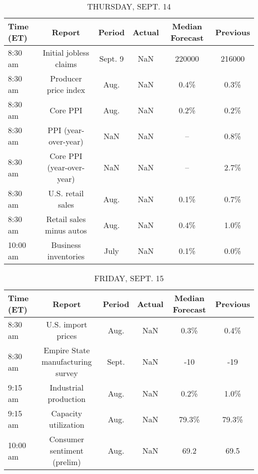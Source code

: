 \documentclass{article}%
\begin{document}
%


\begin{table}[htbp]%
\caption{THURSDAY, SEPT. 14}%
\centering%
\begin{adjustbox}{width=1\textwidth}%
\begin{tabular}{lccccc}
\toprule
Time (ET) &                    Report &  Period & Actual & Median Forecast & Previous \\
\midrule
  8:30 am &    Initial jobless claims & Sept. 9 &    NaN &          220000 &   216000 \\
  8:30 am &      Producer price index &    Aug. &    NaN &            0.4\% &     0.3\% \\
  8:30 am &                  Core PPI &    Aug. &    NaN &            0.2\% &     0.2\% \\
  8:30 am &      PPI (year-over-year) &     NaN &    NaN &              -- &     0.8\% \\
  8:30 am & Core PPI (year-over-year) &     NaN &    NaN &              -- &     2.7\% \\
  8:30 am &         U.S. retail sales &    Aug. &    NaN &            0.1\% &     0.7\% \\
  8:30 am &  Retail sales minus autos &    Aug. &    NaN &            0.4\% &     1.0\% \\
 10:00 am &      Business inventories &    July &    NaN &            0.1\% &     0.0\% \\
\bottomrule
\end{tabular}
%
\end{adjustbox}%
\end{table}

%


\begin{table}[htbp]%
\caption{FRIDAY, SEPT. 15}%
\centering%
\begin{adjustbox}{width=1\textwidth}%
\begin{tabular}{lccccc}
\toprule
Time (ET) &                            Report & Period & Actual & Median Forecast & Previous \\
\midrule
  8:30 am &                U.S. import prices &   Aug. &    NaN &            0.3\% &     0.4\% \\
  8:30 am & Empire State manufacturing survey &  Sept. &    NaN &             -10 &      -19 \\
  9:15 am &             Industrial production &   Aug. &    NaN &            0.2\% &     1.0\% \\
  9:15 am &              Capacity utilization &   Aug. &    NaN &           79.3\% &    79.3\% \\
 10:00 am &       Consumer sentiment (prelim) &   Aug. &    NaN &            69.2 &     69.5 \\
\bottomrule
\end{tabular}
%
\end{adjustbox}%
\end{table}
\end{document}

